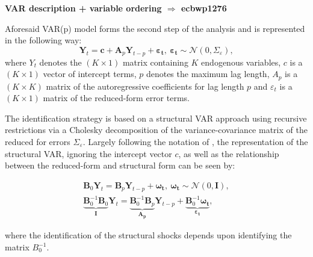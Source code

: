 \textbf{VAR description + variable ordering $\Rightarrow$ ecbwp1276}

Aforesaid VAR(p) model forms the second step of the analysis and is represented in the following way:
\begin{equation}
\mathbf{Y}_t=\mathbf{c}+%
\mathbf{A}_p \mathbf{Y}_{t-p}+\mathbf{\varepsilon_t}, \ \mathbf{\varepsilon_t} \sim \mathcal{N}\left(0, \Sigma_{\varepsilon}\right),
\end{equation}
where $Y_{t}$ denotes the $(K \times 1)$ matrix containing $K$ endogenous variables, $c$ is a $(K \times 1)$ vector of intercept terms, $p$ denotes the maximum lag length, $A_{p}$ is a $(K \times K)$ matrix of the autoregressive coefficients for lag length $p$ and $\varepsilon_{t}$ is a $(K \times 1)$ matrix of the reduced-form error terms. 

The identification strategy is based on a structural VAR approach using recursive restrictions via a Cholesky decomposition of the variance-covariance matrix of the reduced for errors $\Sigma_{\varepsilon}$. Largely following the notation of \citet{kilian2017structural}, the representation of the structural VAR, ignoring the intercept vector $c$, as well as the relationship between the reduced-form and structural form can be seen by:

\begin{equation}
    \begin{split}
   \mathbf{B}_{0}\mathbf{Y}_t= \mathbf{B}_p \mathbf{Y}_{t-p}+\mathbf{\omega_t}, \ \mathbf{\omega_{t}} \sim \mathcal{N}\left(0, \mathbf{I}\right), \\
    \underbrace{\mathbf{B}^{-1}_{0}\mathbf{B}_{0}}_{\mathbf{I}}\mathbf{Y}_t= \underbrace{\mathbf{B}^{-1}_{0}\mathbf{B}_p}_{\mathbf{A_p}} \mathbf{Y}_{t-p}+\underbrace{\mathbf{B}^{-1}_{0}\mathbf{\omega_t}}_{\mathbf{\varepsilon_{t}}},
    \end{split} 
\end{equation}

where the identification of the structural shocks depends upon identifying the matrix $B^{-1}_{0}$. 

